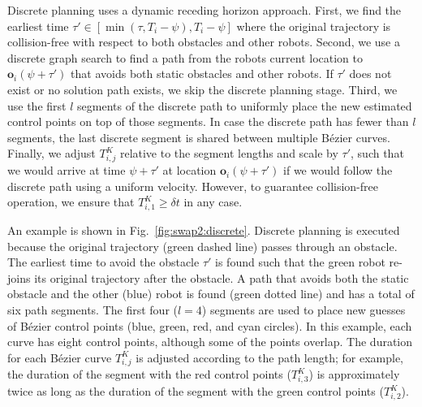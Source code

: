 \documentclass{svproc}
\newcommand{\vo}{\mathbf{o}}
\newcommand{\todo}[1]{\textbf{\textcolor{red}{TODO: #1}}}
\begin{document}
Discrete planning uses a dynamic receding horizon approach. First, we find the earliest time $\tau'\in [\min(\tau, T_i-\psi), T_i-\psi]$ where the original trajectory is collision-free with respect to both obstacles and other robots.
Second, we use a discrete graph search to find a path from the robots current location to $\vo_i(\psi+\tau')$ that avoids both static obstacles and other robots.
If $\tau'$ does not exist or no solution path exists, we skip the discrete planning stage.
Third, we use the first $l$ segments of the discrete path to uniformly place the new estimated control points on top of those segments.
In case the discrete path has fewer than $l$ segments, the last discrete segment is shared between multiple B\'ezier curves.
Finally, we adjust $T_{i,j}^K$ relative to the segment lengths and scale by $\tau'$, such that we would arrive at time $\psi+\tau'$ at location $\vo_i(\psi+\tau')$ if we would follow the discrete path using a uniform velocity.
However, to guarantee collision-free operation, we ensure that $T_{i,1}^K\geq \delta t$ in any case.

An example is shown in Fig.~\ref{fig:swap2:discrete}. 
Discrete planning is executed because the original trajectory (green dashed line) passes through an obstacle.
The earliest time to avoid the obstacle $\tau'$ is found such that the green robot re-joins its original trajectory after the obstacle.
A path that avoids both the static obstacle and the other (blue) robot is found (green dotted line) and has a total of six path segments.
The first four ($l=4$) segments are used to place new guesses of B\'ezier control points (blue, green, red, and cyan circles).
In this example, each curve has eight control points, although some of the points overlap.
The duration for each B\'ezier curve $T^{K}_{i,j}$ is adjusted according to the path length; for example, the duration of the segment with the red control points ($T_{i,3}^K$) is approximately twice as long as the duration of the segment with the green control points ($T_{i,2}^K$).







\end{document}
